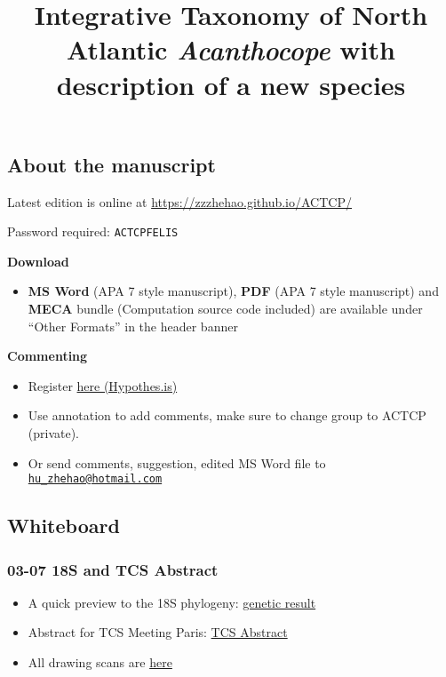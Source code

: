 \documentclass[
  man,
  longtable,
  nolmodern,
  notxfonts,
  notimes,
  colorlinks=true,linkcolor=blue,citecolor=blue,urlcolor=blue]{apa7}
\title{Integrative Taxonomy of North Atlantic \emph{Acanthocope} with
description of a new species}
\providecommand{\tightlist}{%
  \setlength{\itemsep}{0pt}\setlength{\parskip}{0pt}}
\begin{document}
\maketitle


\setcounter{secnumdepth}{-\maxdimen} %

\setlength\LTleft{0pt}


\subsection{About the manuscript}\label{about-the-manuscript}

Latest edition is online at
\href{https://zzzhehao.github.io/ACTCP/\#ACTCPFELIS}{https://zzzhehao.github.io/ACTCP/}

Password required: \texttt{ACTCPFELIS}

\textbf{Download}

\begin{itemize}
\tightlist
\item
  \textbf{MS Word} (APA 7 style manuscript), \textbf{PDF} (APA 7 style
  manuscript) and \textbf{MECA} bundle (Computation source code
  included) are available under ``Other Formats'' in the header banner
\end{itemize}

\textbf{Commenting}

\begin{itemize}
\tightlist
\item
  Register \href{https://hypothes.is/groups/6KpDgDmQ/actcp}{here
  (Hypothes.is)}
\item
  Use annotation to add comments, make sure to change group to ACTCP
  (private).
\item
  Or send comments, suggestion, edited MS Word file to
  \href{mailto:hu_zhehao@hotmail.com}{\nolinkurl{hu\_zhehao@hotmail.com}}
\end{itemize}

\subsection{Whiteboard}\label{whiteboard}

\subsubsection{\texorpdfstring{\textbf{03-07} 18S and TCS
Abstract}{03-07 18S and TCS Abstract}}\label{s-and-tcs-abstract}

\begin{itemize}
\tightlist
\item
  A quick preview to the 18S phylogeny:
  \href{./notebooks/42\%20Result\%20-\%20Genetics.qmd}{genetic result}
\item
  Abstract for TCS Meeting Paris:
  \href{./notebooks/11\%20TCS-Abstract.qmd}{TCS Abstract}
\item
  All drawing scans are \href{./notebooks/51\%20Drawing.qmd}{here}
\end{itemize}
\end{document}

